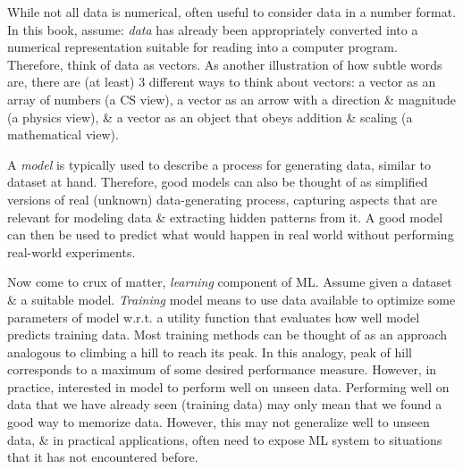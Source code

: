 \documentclass{article}
\begin{document}
\begin{enumerate}
\begin{itemize}
\begin{itemize}
			While not all data is numerical, often useful to consider data in a number format. In this book, assume: {\it data} has already been appropriately converted into a numerical representation suitable for reading into a computer program. Therefore, think of data as vectors. As another illustration of how subtle words are, there are (at least) 3 different ways to think about vectors: a vector as an array of numbers (a CS view), a vector as an arrow with a direction \& magnitude (a physics view), \& a vector as an object that obeys addition \& scaling (a mathematical view).
			
			A {\it model} is typically used to describe a process for generating data, similar to dataset at hand. Therefore, good models can also be thought of as simplified versions of real (unknown) data-generating process, capturing aspects that are relevant for modeling data \& extracting hidden patterns from it. A good model can then be used to predict what would happen in real world without performing real-world experiments.
			
			Now come to crux of matter, {\it learning} component of ML. Assume given a dataset \& a suitable model. {\it Training} model means to use data available to optimize some parameters of model w.r.t. a utility function that evaluates how well model predicts training data. Most training methods can be thought of as an approach analogous to climbing a hill to reach its peak. In this analogy, peak of hill corresponds to a maximum of some desired performance measure. However, in practice, interested in model to perform well on unseen data. Performing well on data that we have already seen (training data) may only mean that we found a good way to memorize data. However, this may not generalize well to unseen data, \& in practical applications, often need to expose ML system to situations that it has not encountered before.
			

\end{itemize}
\end{itemize}
\end{enumerate}
\end{document}
